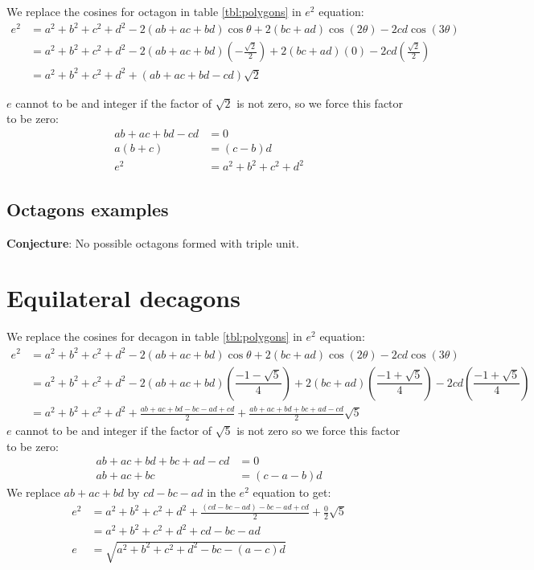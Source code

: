 \documentclass[11pt]{article}
\begin{document}
We replace the cosines for octagon in table \ref{tbl:polygons} in $e^2$ equation:
\begin{align}
e^2 &= a^2 +b^2 +c^2 +d^2 -2(ab+ac+bd)\cos\theta +2(bc+ad)\cos(2\theta) -2cd\cos(3\theta) \nonumber\\
 &= a^2 +b^2 +c^2 +d^2 
 -2(ab+ac+bd)\left(-\frac{\sqrt{2}}{2}\right) 
 +2(bc+ad)\left(0\right) 
 -2cd\left(\frac{\sqrt{2}}{2}\right) \nonumber\\
 &= a^2 +b^2 +c^2 +d^2 +(ab +ac +bd -cd)\sqrt{2}
\end{align} 

$e$ cannot to be and integer if the factor of $\sqrt{2}$ is not zero, so we force this factor to be zero:
\begin{align}
ab + ac + bd - cd &= 0 \nonumber\\
a(b+c) &= (c-b)d \\
e^2 &= a^2 +b^2 +c^2 +d^2 
\end{align}

\subsection{Octagons examples}

\textbf{Conjecture}: No possible octagons formed with triple unit.

\section{Equilateral decagons}

We replace the cosines for decagon in table \ref{tbl:polygons} in $e^2$ equation:
\begin{align}
e^2 &= a^2 +b^2 +c^2 +d^2 -2(ab+ac+bd)\cos\theta +2(bc+ad)\cos(2\theta) -2cd\cos(3\theta) \nonumber\\
 &= a^2 +b^2 +c^2 +d^2
  -2(ab+ac+bd)\left(\dfrac{-1-\sqrt{5}}{4}\right)
  +2(bc+ad)\left(\dfrac{-1+\sqrt{5}}{4}\right)
  -2cd\left(\dfrac{-1+\sqrt{5}}{4}\right) \nonumber\\
 &= a^2 +b^2 +c^2 +d^2 +\frac{ab+ac+bd -bc-ad +cd}{2} +\frac{ab+ac+bd +bc+ad -cd}{2}\sqrt{5}
\end{align}
$e$ cannot to be and integer if the factor of $\sqrt{5}$ is not zero so we force this factor to be zero:
\begin{align}
 ab+ac+bd +bc+ad -cd &= 0\nonumber\\
 ab+ac+bc &= (c -a -b)d
\end{align}
We replace $ab+ac+bd$ by $cd -bc-ad$ in the $e^2$ equation to get:
\begin{align}
e^2 &= a^2 +b^2 +c^2 +d^2 +\frac{(cd -bc-ad) -bc-ad+cd}{2} +\frac{0}{2}\sqrt{5} \nonumber\\
 &= a^2 +b^2 +c^2 +d^2 + cd -bc -ad\nonumber\\
e &= \sqrt{a^2 +b^2 +c^2 +d^2 -bc -(a-c)d }
\end{align}
\end{document}
